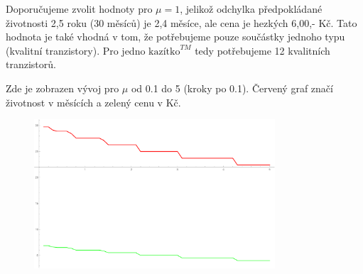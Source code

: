 \documentclass[12pt, a4paper]{article}
\begin{document}
Doporučujeme zvolit hodnoty pro $\mu=1$, jelikož odchylka předpokládané životnosti 2,5 roku (30 měsíců) je 2,4 měsíce, ale cena je hezkých 6,00,- Kč. Tato hodnota je také vhodná v tom, že potřebujeme pouze součástky jednoho typu (kvalitní tranzistory). Pro jedno $\text{kazítko}^{TM}$ tedy potřebujeme 12 kvalitních tranzistorů.

Zde je zobrazen vývoj pro $\mu$ od 0.1 do 5 (kroky po 0.1). Červený graf značí životnost v měsících a zelený cenu v Kč.
\begin{figure}[h]
\centering
\includegraphics[width=0.8\textwidth]{graf.pdf}
\end{figure}
\end{document}
